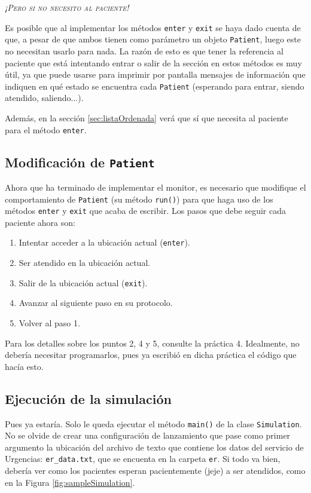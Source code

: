 \documentclass[10pt,a4paper,spanish]{article}
\newcommand{\sombreado}[2]{
  \begin{shaded}
    \begin{center} \emph{\textsc{#1}} \end{center}
    \noindent #2\\
  \end{shaded}
}
\newcommand{\code}[1]{\texttt{#1}}
\begin{document}
\sombreado{¡Pero si no necesito al paciente!}{Es posible que al implementar los métodos \code{enter} y \code{exit} se haya dado cuenta de que, a pesar de que ambos tienen como parámetro un objeto \code{Patient}, luego este no necesitan usarlo para nada. La razón de esto es que tener la referencia al paciente que está intentando entrar o salir de la sección en estos métodos es muy útil, ya que puede usarse para imprimir por pantalla mensajes de información que indiquen en qué estado se encuentra cada \code{Patient} (esperando para entrar, siendo atendido, saliendo...).

Además, en la sección \ref{sec:listaOrdenada} verá que sí que necesita al paciente para el método \code{enter}.}

\subsection{Modificación de \code{Patient}}

Ahora que ha terminado de implementar el monitor, es necesario que modifique el comportamiento de \code{Patient} (su método \code{run()}) para que haga uso de los métodos \code{enter} y \code{exit} que acaba de escribir. Los pasos que debe seguir cada paciente ahora son:

\begin{enumerate}
    \item Intentar acceder a la ubicación actual (\code{enter}).
    \item Ser atendido en la ubicación actual.
    \item Salir de la ubicación actual (\code{exit}).
    \item Avanzar al siguiente paso en su protocolo.
    \item Volver al paso 1.
\end{enumerate}

Para los detalles sobre los puntos 2, 4 y 5, consulte la práctica 4. Idealmente, no debería necesitar programarlos, pues ya escribió en dicha práctica el código que hacía esto.

\subsection{Ejecución de la simulación}
\label{sec:ejecucion}

Pues ya estaría. Solo le queda ejecutar el método \code{main()} de la clase \code{Simulation}. No se olvide de crear una configuración de lanzamiento que pase como primer argumento la ubicación del archivo de texto que contiene los datos del servicio de Urgencias: \code{er\_data.txt}, que se encuenta en la carpeta \code{er}. Si todo va bien, debería ver como los pacientes esperan pacientemente (jeje) a ser atendidos, como en la Figura \ref{fig:sampleSimulation}.
\end{document}
